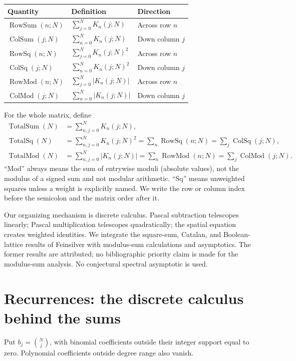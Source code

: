 \documentclass[11pt,reqno]{amsart}
\theoremstyle{remark}\newtheorem{remark}[theorem]{Remark}
\DeclareMathOperator{\RowSum}{RowSum}
\DeclareMathOperator{\ColSum}{ColSum}
\DeclareMathOperator{\TotalSum}{TotalSum}
\DeclareMathOperator{\RowSq}{RowSq}
\DeclareMathOperator{\ColSq}{ColSq}
\DeclareMathOperator{\TotalSq}{TotalSq}
\DeclareMathOperator{\RowMod}{RowMod}
\DeclareMathOperator{\ColMod}{ColMod}
\DeclareMathOperator{\TotalMod}{TotalMod}
\begin{document}
\begin{center}\small
\begin{tabular}{lll}
\textbf{Quantity}&\textbf{Definition}&\textbf{Direction}\\\hline
$\RowSum(n;N)$&$\sum_{j=0}^N K_n(j;N)$&Across row $n$\\[3pt]
$\ColSum(j;N)$&$\sum_{n=0}^N K_n(j;N)$&Down column $j$\\[3pt]
$\RowSq(n;N)$&$\sum_{j=0}^N K_n(j;N)^2$&Across row $n$\\[3pt]
$\ColSq(j;N)$&$\sum_{n=0}^N K_n(j;N)^2$&Down column $j$\\[3pt]
$\RowMod(n;N)$&$\sum_{j=0}^N|K_n(j;N)|$&Across row $n$\\[3pt]
$\ColMod(j;N)$&$\sum_{n=0}^N|K_n(j;N)|$&Down column $j$
\end{tabular}
\end{center}
For the whole matrix, define
\begin{align*}
\TotalSum(N)&=\sum_{n,j=0}^N K_n(j;N),\\
\TotalSq(N)&=\sum_{n,j=0}^N K_n(j;N)^2=\sum_n\RowSq(n;N)=\sum_j\ColSq(j;N),\\
\TotalMod(N)&=\sum_{n,j=0}^N|K_n(j;N)|=\sum_n\RowMod(n;N)=\sum_j\ColMod(j;N).
\end{align*}
``Mod'' always means the sum of entrywise moduli (absolute values), not the modulus of a signed sum and not modular arithmetic. ``Sq'' means unweighted squares unless a weight is explicitly named. We write the row or column index before the semicolon and the matrix order after it.

Our organizing mechanism is discrete calculus. Pascal subtraction telescopes linearly; Pascal multiplication telescopes quadratically; the spatial equation creates weighted identities. We integrate the square-sum, Catalan, and Boolean-lattice results of Feinsilver \cite{Feinsilver2016} with modulus-sum calculations and asymptotics. The former results are attributed; no bibliographic priority claim is made for the modulus-sum analysis. No conjectural spectral asymptotic is used.

\section{Recurrences: the discrete calculus behind the sums}
Put $b_j=\binom Nj$, with binomial coefficients outside their integer support equal to zero. Polynomial coefficients outside degree range also vanish.
\end{document}
